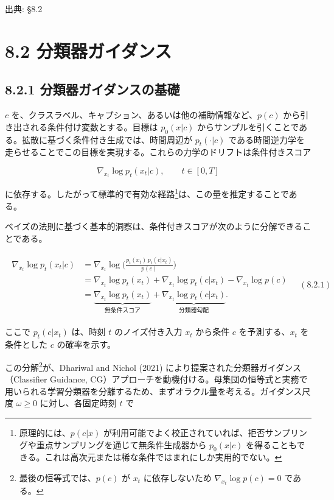 

{\color{gray}\footnotesize 出典: §8.2\par}
\vspace{0.2em}

\section*{8.2 分類器ガイダンス}


\subsection*{8.2.1 分類器ガイダンスの基礎}


$c$ を、クラスラベル、キャプション、あるいは他の補助情報など、$p(c)$ から引き出される条件付け変数とする。目標は $p_0(x|c)$ からサンプルを引くことである。拡散に基づく条件付き生成では、時間周辺が $p_t(\cdot|c)$ である時間逆力学を走らせることでこの目標を実現する。これらの力学のドリフトは条件付きスコア

\[
\nabla_{x_t}\log p_t(x_t|c),\qquad t\in[0,T]
\]


に依存する。したがって標準的で有効な経路\footnote{原理的には、$p(c|x)$ が利用可能でよく校正されていれば、拒否サンプリングや重点サンプリングを通じて無条件生成器から $p_0(x|c)$ を得ることもできる。これは高次元または稀な条件ではまれにしか実用的でない。}は、この量を推定することである。

ベイズの法則に基づく基本的洞察は、条件付きスコアが次のように分解できることである。

\begin{align*}
\begin{aligned}
\nabla_{x_t}\log p_t(x_t|c)
&=
\nabla_{x_t}\log\Biggl(\frac{p_t(x_t)\,p_t(c|x_t)}{p(c)}\Biggr)\\
&=
\nabla_{x_t}\log p_t(x_t)+\nabla_{x_t}\log p_t(c|x_t)-\nabla_{x_t}\log p(c)\\
&=
\underbrace{\nabla_{x_t}\log p_t(x_t)}_{\text{無条件スコア}}
+
\underbrace{\nabla_{x_t}\log p_t(c|x_t)}_{\text{分類器勾配}}.
\end{aligned}
\quad (8.2.1)
\end{align*}


ここで $p_t(c|x_t)$ は、時刻 $t$ のノイズ付き入力 $x_t$ から条件 $c$ を予測する、$x_t$ を条件とした $c$ の確率を示す。

この分解\footnote{最後の恒等式では、$p(c)$ が $x_t$ に依存しないため $\nabla_{x_t}\log p(c)=0$ である。}が、Dhariwal and Nichol (2021) により提案された分類器ガイダンス（Classifier Guidance, CG）アプローチを動機付ける。母集団の恒等式と実務で用いられる学習分類器を分離するため、まずオラクル量を考える。ガイダンス尺度 $\omega\ge 0$ に対し、各固定時刻 $t$ で

